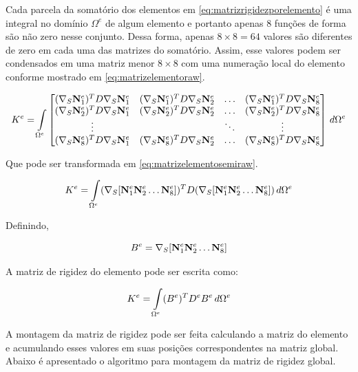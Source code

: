 Cada parcela da somatório dos elementos em \eqref{eq:matrizrigidezporelemento} é uma integral no domínio $\Omega^e$ de algum elemento e portanto apenas 8 funções de forma são não zero nesse conjunto. Dessa forma, apenas $8\times8=64$ valores são diferentes de zero em cada uma das matrizes do somatório. Assim, esse valores podem ser condensados em uma matriz menor $8\times8$ com uma numeração local do elemento conforme mostrado em \eqref{eq:matrizelementoraw}.

\begin{equation}\label{eq:matrizelementoraw}
    K^e = 
\omeeint{
\begin{bmatrix}
\kije{1}{1} & \kije{1}{2}  & \hdots & \kije{1}{8}  \\ 
\kije{2}{1} & \kije{2}{2}  & \hdots & \kije{2}{8}  \\ 
\vdots      &              & \ddots & \vdots       \\ 
\kije{8}{1} & \kije{8}{2}  & \hdots & \kije{8}{8} 
\end{bmatrix}
}
\end{equation}

Que pode ser transformada em \eqref{eq:matrizelementosemiraw}.

\begin{equation}\label{eq:matrizelementosemiraw}
    K^e =\omeeint{ (\sopnabla [\basefunctionelem[1] \basefunctionelem[2] \hdots \basefunctionelem[8] ]) ^T D (\sopnabla [\basefunctionelem[1] \basefunctionelem[2] \hdots \basefunctionelem[8]])}
\end{equation}

Definindo, 

\begin{equation}
    B^e = \sopnabla [\basefunctionelem[1] \basefunctionelem[2] \hdots \basefunctionelem[8] ]
\end{equation}

A matriz de rigidez do elemento pode ser escrita como:

\begin{equation} \label{eq:}
    K^e = \omeeint{(B^e)^T D^e B^e}
\end{equation}


A montagem da matriz de rigidez pode ser feita calculando a matriz do elemento e acumulando esses valores em suas posições correspondentes na matriz global. Abaixo é apresentado  o algoritmo para montagem da matriz de rigidez global.

\vspace{1cm}
\noindent{}
\vspace{1cm}


